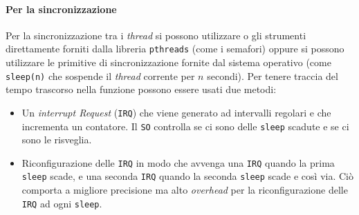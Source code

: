         \paragraph{Per la sincronizzazione} Per la sincronizzazione tra i \textit{thread} si possono utilizzare o gli strumenti direttamente forniti dalla libreria \texttt{pthreads} (come i semafori) oppure si possono utilizzare le primitive di sincronizzazione fornite dal sistema operativo (come \texttt{sleep(n)} che sospende il \textit{thread} corrente per $n$ secondi). Per tenere traccia del tempo trascorso nella funzione possono essere usati due metodi:
        \begin{itemize}
            \item Un \textit{interrupt Request} (\texttt{IRQ}) che viene generato ad intervalli regolari e che incrementa un contatore. Il \texttt{SO} controlla se ci sono delle \texttt{sleep} scadute e se ci sono le risveglia.
            \item Riconfigurazione delle \texttt{IRQ} in modo che avvenga una \texttt{IRQ} quando la prima \texttt{sleep} scade, e una seconda \texttt{IRQ} quando la seconda \texttt{sleep} scade e così via. Ciò comporta a migliore precisione ma alto \textit{overhead} per la riconfigurazione delle \texttt{IRQ} ad ogni \texttt{sleep}.
        \end{itemize}